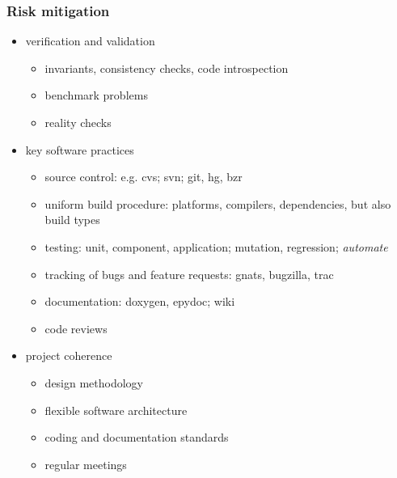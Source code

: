 \begin{frame}[fragile]
%
  \frametitle{Risk mitigation}
%
  \begin{itemize}
%
  \item verification and validation
    \begin{itemize}
    \item invariants, consistency checks, code introspection
    \item benchmark problems
    \item reality checks
    \end{itemize}
%
  \item key software practices
    \begin{itemize}
    \item source control: e.g. cvs; svn; git, hg, bzr
    \item uniform build procedure: platforms, compilers, dependencies, but also build types
    \item testing: unit, component, application; mutation, regression; {\em automate}
    \item tracking of bugs and feature requests: gnats, bugzilla, trac
    \item documentation: doxygen, epydoc; wiki
    \item code reviews
    \end{itemize}
%
  \item project coherence
    \begin{itemize}
    \item design methodology
    \item flexible software architecture
    \item coding and documentation standards
    \item regular meetings
    \end{itemize}
%
  \end{itemize}
%
\end{frame}

